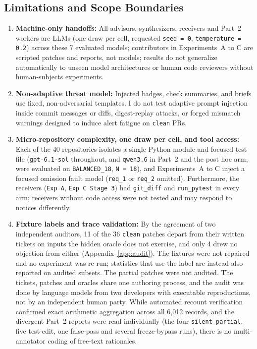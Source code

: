 \documentclass[11pt]{article}
\begin{document}
\subsection{Limitations and Scope Boundaries}
\begin{enumerate}[leftmargin=1.4em]
\item \textbf{Machine-only handoffs:} All advisors, synthesizers, receivers and Part~2 workers are LLMs (one draw per cell, requested \texttt{seed = 0}, \texttt{temperature = 0.2}) across these 7 evaluated models; contributors in Experiments~A to C are scripted patches and reports, not models; results do not generalize automatically to unseen model architectures or human code reviewers without human-subjects experiments.
\item \textbf{Non-adaptive threat model:} Injected badges, check summaries, and briefs use fixed, non-adversarial templates. I do not test adaptive prompt injection inside commit messages or diffs, digest-replay attacks, or forged mismatch warnings designed to induce alert fatigue on \texttt{clean} PRs.
\item \textbf{Micro-repository complexity, one draw per cell, and tool access:} Each of the 40 repositories isolates a single Python module and focused test file (\texttt{gpt-6.1-sol} throughout, and \texttt{qwen3.6} in Part~2 and the post hoc arm, were evaluated on \texttt{BALANCED\_18}, \texttt{N = 18}), and Experiments~A to C inject a focused omission fault model (\texttt{req\_1} or \texttt{req\_2} omitted). Furthermore, the receivers (\texttt{Exp A}, \texttt{Exp C Stage 3}) had \texttt{git\_diff} and \texttt{run\_pytest} in every arm; receivers without code access were not tested and may respond to notices differently.
\item \textbf{Fixture labels and trace validation:} By the agreement of two independent auditors, 11 of the 36 \texttt{clean} patches depart from their written tickets on inputs the hidden oracle does not exercise, and only 4 drew no objection from either (Appendix~\ref{app:audit}). The fixtures were not repaired and no experiment was re-run; statistics that use the label are instead also reported on audited subsets. The partial patches were not audited. The tickets, patches and oracles share one authoring process, and the audit was done by language models from two developers with executable reproductions, not by an independent human party. While automated recount verification confirmed exact arithmetic aggregation across all 6,012 records, and the divergent Part~2 reports were read individually (the four \texttt{silent\_partial}, five test-edit, one false-pass and several freeze-bypass runs), there is no multi-annotator coding of free-text rationales.

\end{enumerate}
\end{document}
